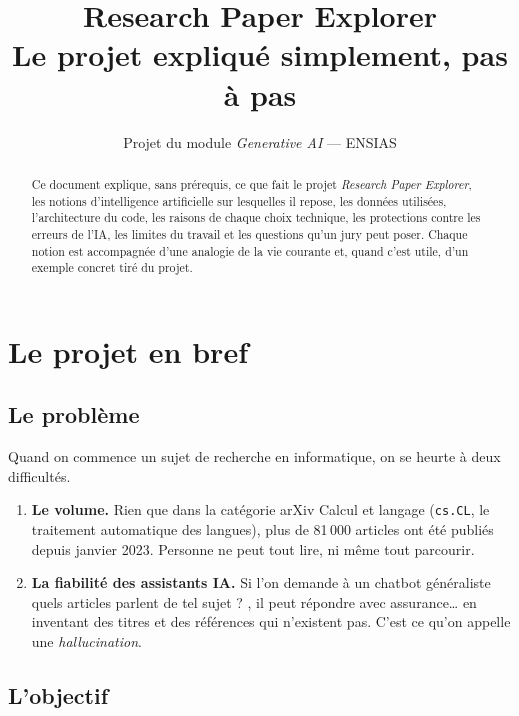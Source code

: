 \documentclass[11pt,a4paper]{article}
\title{\textbf{Research Paper Explorer}\\[0.4em]
\large Le projet expliqué simplement, pas à pas}
\author{Projet du module \emph{Generative AI} --- ENSIAS}
\date{}
\newcommand{\code}[1]{\texttt{#1}}
\begin{document}
\maketitle

\begin{abstract}
Ce document explique, sans prérequis, ce que fait le projet \emph{Research Paper Explorer},
les notions d'intelligence artificielle sur lesquelles il repose, les données utilisées,
l'architecture du code, les raisons de chaque choix technique, les protections contre les
erreurs de l'IA, les limites du travail et les questions qu'un jury peut poser. Chaque notion
est accompagnée d'une analogie de la vie courante et, quand c'est utile, d'un exemple
concret tiré du projet.
\end{abstract}

\tableofcontents
\newpage

\section{Le projet en bref}

\subsection{Le problème}

Quand on commence un sujet de recherche en informatique, on se heurte à deux difficultés.

\begin{enumerate}
  \item \textbf{Le volume.} Rien que dans la catégorie arXiv \og Calcul et langage \fg{}
  (\code{cs.CL}, le traitement automatique des langues), plus de 81\,000 articles ont été
  publiés depuis janvier 2023. Personne ne peut tout lire, ni même tout parcourir.
  \item \textbf{La fiabilité des assistants IA.} Si l'on demande à un chatbot généraliste
  \og quels articles parlent de tel sujet ? \fg{}, il peut répondre avec assurance\ldots{}
  en inventant des titres et des références qui n'existent pas. C'est ce qu'on appelle une
  \emph{hallucination}.
\end{enumerate}

\subsection{L'objectif}
\end{document}
